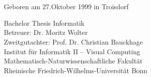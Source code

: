 \begin{titlepage}
    \begin{addmargin}[-1cm]{-3cm}
    \begin{center}
        \large

        \hfill

        \vfill

        \begingroup
            \centering %

            \color{CTtitle}\spacedallcaps{\myTitle} \\ \bigskip
        \endgroup

        \centering
        \spacedlowsmallcaps{\myName}\\ \bigskip
        Geboren am 27.Oktober 1999 in Troisdorf
        \vfill

        \begin{center} %
            \begin{minipage}{\textwidth}
                \centering
            \end{minipage}
        \end{center}
        \vfill


        Bachelor Thesis Informatik\\ \bigskip \bigskip
        Betreuer: Dr. Moritz Wolter \\
        Zweitgutachter: Prof. Dr. Christian Bauckhage \\ \medskip
        Institut für Informatik II – Visual Computing\\ \bigskip
        Mathematisch-Naturwissenschaftliche Fakultät\\
Rheinische Friedrich-Wilhelms-Universität Bonn\\ \bigskip \bigskip
     

        \myTime

        \vfill

    \end{center}
  \end{addmargin}
\end{titlepage}
